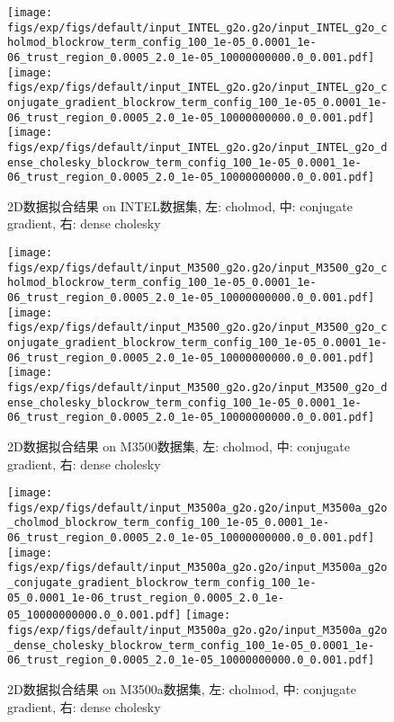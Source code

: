 \documentclass{ctexart}
\begin{document}
\begin{figure}[!htbp]
	\centering
	\texttt{[image: figs/exp/figs/default/input\_INTEL\_g2o.g2o/input\_INTEL\_g2o\_cholmod\_blockrow\_term\_config\_100\_1e-05\_0.0001\_1e-06\_trust\_region\_0.0005\_2.0\_1e-05\_10000000000.0\_0.001.pdf]}
	\texttt{[image: figs/exp/figs/default/input\_INTEL\_g2o.g2o/input\_INTEL\_g2o\_conjugate\_gradient\_blockrow\_term\_config\_100\_1e-05\_0.0001\_1e-06\_trust\_region\_0.0005\_2.0\_1e-05\_10000000000.0\_0.001.pdf]}
	\texttt{[image: figs/exp/figs/default/input\_INTEL\_g2o.g2o/input\_INTEL\_g2o\_dense\_cholesky\_blockrow\_term\_config\_100\_1e-05\_0.0001\_1e-06\_trust\_region\_0.0005\_2.0\_1e-05\_10000000000.0\_0.001.pdf]}
	\caption{2D数据拟合结果 on INTEL数据集, 左: cholmod, 中: conjugate gradient, 右: dense cholesky}\label{exp_intel}
\end{figure}

\begin{figure}[!htbp]
	\centering
	\texttt{[image: figs/exp/figs/default/input\_M3500\_g2o.g2o/input\_M3500\_g2o\_cholmod\_blockrow\_term\_config\_100\_1e-05\_0.0001\_1e-06\_trust\_region\_0.0005\_2.0\_1e-05\_10000000000.0\_0.001.pdf]}
	\texttt{[image: figs/exp/figs/default/input\_M3500\_g2o.g2o/input\_M3500\_g2o\_conjugate\_gradient\_blockrow\_term\_config\_100\_1e-05\_0.0001\_1e-06\_trust\_region\_0.0005\_2.0\_1e-05\_10000000000.0\_0.001.pdf]}
	\texttt{[image: figs/exp/figs/default/input\_M3500\_g2o.g2o/input\_M3500\_g2o\_dense\_cholesky\_blockrow\_term\_config\_100\_1e-05\_0.0001\_1e-06\_trust\_region\_0.0005\_2.0\_1e-05\_10000000000.0\_0.001.pdf]}
	\caption{2D数据拟合结果 on M3500数据集, 左: cholmod, 中: conjugate gradient, 右: dense cholesky}\label{exp_m3500}
\end{figure}

\begin{figure}[!htbp]
	\centering
	\texttt{[image: figs/exp/figs/default/input\_M3500a\_g2o.g2o/input\_M3500a\_g2o\_cholmod\_blockrow\_term\_config\_100\_1e-05\_0.0001\_1e-06\_trust\_region\_0.0005\_2.0\_1e-05\_10000000000.0\_0.001.pdf]}
	\texttt{[image: figs/exp/figs/default/input\_M3500a\_g2o.g2o/input\_M3500a\_g2o\_conjugate\_gradient\_blockrow\_term\_config\_100\_1e-05\_0.0001\_1e-06\_trust\_region\_0.0005\_2.0\_1e-05\_10000000000.0\_0.001.pdf]}
	\texttt{[image: figs/exp/figs/default/input\_M3500a\_g2o.g2o/input\_M3500a\_g2o\_dense\_cholesky\_blockrow\_term\_config\_100\_1e-05\_0.0001\_1e-06\_trust\_region\_0.0005\_2.0\_1e-05\_10000000000.0\_0.001.pdf]}
	\caption{2D数据拟合结果 on M3500a数据集, 左: cholmod, 中: conjugate gradient, 右: dense cholesky}\label{exp_m3500a}
\end{figure}
\end{document}

